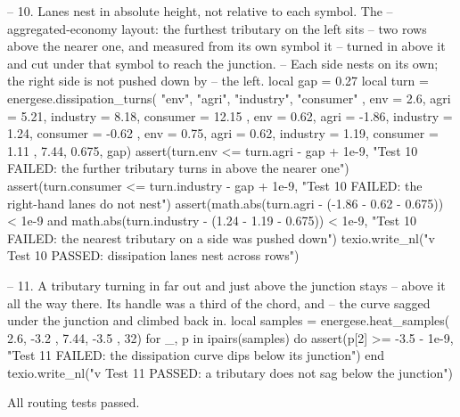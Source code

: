 \documentclass{article}
\begin{document}
\begin{luacode*}
    -- 10. Lanes nest in absolute height, not relative to each symbol. The
    --     aggregated-economy layout: the furthest tributary on the left sits
    --     two rows above the nearer one, and measured from its own symbol it
    --     turned in above it and cut under that symbol to reach the junction.
    --     Each side nests on its own; the right side is not pushed down by
    --     the left.
    local gap = 0.27
    local turn = energese.dissipation_turns(
        { "env", "agri", "industry", "consumer" },
        { env = 2.6, agri = 5.21, industry = 8.18, consumer = 12.15 },
        { env = 0.62, agri = -1.86, industry = 1.24, consumer = -0.62 },
        { env = 0.75, agri = 0.62, industry = 1.19, consumer = 1.11 },
        7.44, 0.675, gap)
    assert(turn.env <= turn.agri - gap + 1e-9,
           "Test 10 FAILED: the further tributary turns in above the nearer one")
    assert(turn.consumer <= turn.industry - gap + 1e-9,
           "Test 10 FAILED: the right-hand lanes do not nest")
    assert(math.abs(turn.agri - (-1.86 - 0.62 - 0.675)) < 1e-9
           and math.abs(turn.industry - (1.24 - 1.19 - 0.675)) < 1e-9,
           "Test 10 FAILED: the nearest tributary on a side was pushed down")
    texio.write_nl("v Test 10 PASSED: dissipation lanes nest across rows")

    -- 11. A tributary turning in far out and just above the junction stays
    --     above it all the way there. Its handle was a third of the chord, and
    --     the curve sagged under the junction and climbed back in.
    local samples = energese.heat_samples({ { 2.6, -3.2 }, { 7.44, -3.5 } }, 32)
    for _, p in ipairs(samples) do
        assert(p[2] >= -3.5 - 1e-9,
               "Test 11 FAILED: the dissipation curve dips below its junction")
    end
    texio.write_nl("v Test 11 PASSED: a tributary does not sag below the junction")
\end{luacode*}

All routing tests passed.
\end{document}
